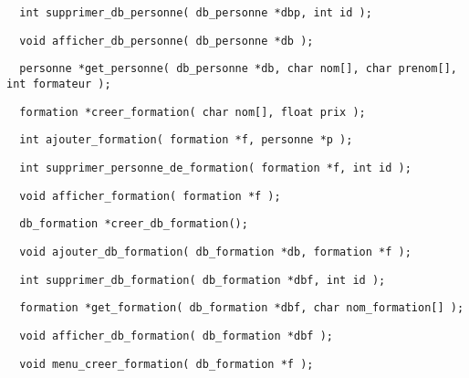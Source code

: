 \documentclass[11pt]{article}
\begin{document}
\begin{lstlisting}
  int supprimer_db_personne( db_personne *dbp, int id );
\end{lstlisting}

\begin{lstlisting}
  void afficher_db_personne( db_personne *db );
\end{lstlisting}

\begin{lstlisting}
  personne *get_personne( db_personne *db, char nom[], char prenom[], int formateur );
\end{lstlisting}

\begin{lstlisting}
  formation *creer_formation( char nom[], float prix );
\end{lstlisting}

\begin{lstlisting}
  int ajouter_formation( formation *f, personne *p );
\end{lstlisting}

\begin{lstlisting}
  int supprimer_personne_de_formation( formation *f, int id );
\end{lstlisting}

\begin{lstlisting}
  void afficher_formation( formation *f );
\end{lstlisting}

\begin{lstlisting}
  db_formation *creer_db_formation();
\end{lstlisting}

\begin{lstlisting}
  void ajouter_db_formation( db_formation *db, formation *f );
\end{lstlisting}

\begin{lstlisting}
  int supprimer_db_formation( db_formation *dbf, int id );
\end{lstlisting}

\begin{lstlisting}
  formation *get_formation( db_formation *dbf, char nom_formation[] );
\end{lstlisting}

\begin{lstlisting}
  void afficher_db_formation( db_formation *dbf );
\end{lstlisting}

\begin{lstlisting}
  void menu_creer_formation( db_formation *f );
\end{lstlisting}
\end{document}
